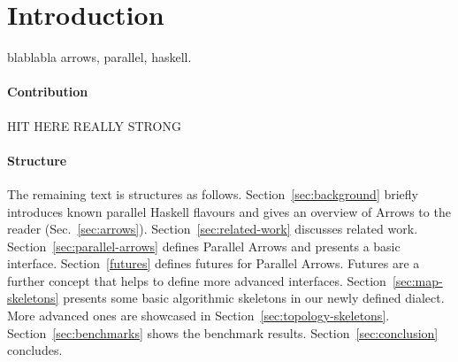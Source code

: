 
\section{Introduction}
\label{sec:introduction}

blablabla arrows, parallel, haskell.

\paragraph{Contribution}

HIT HERE REALLY STRONG

\paragraph{Structure}
The remaining text is structures as follows. Section~\ref{sec:background} briefly introduces known parallel Haskell flavours and gives an overview of Arrows to the reader (Sec.~\ref{sec:arrows}). Section~\ref{sec:related-work} discusses related work. Section~\ref{sec:parallel-arrows} defines Parallel Arrows and presents a basic interface. Section~\ref{futures} defines futures for Parallel Arrows. Futures are a further concept that helps to define more advanced interfaces. Section~\ref{sec:map-skeletons} presents some basic algorithmic skeletons in our newly defined dialect. More advanced ones are showcased in Section~\ref{sec:topology-skeletons}. Section~\ref{sec:benchmarks} shows the benchmark results. Section~\ref{sec:conclusion} concludes.

